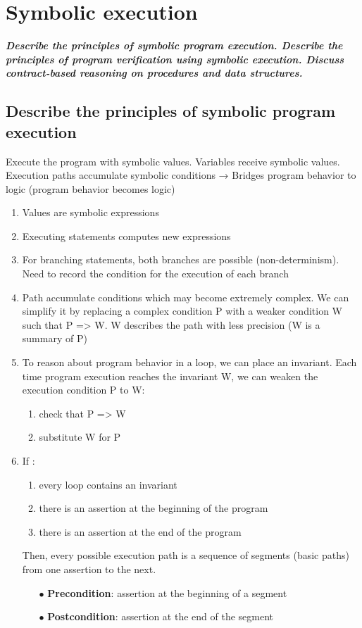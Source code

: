 \documentclass{article}
\begin{document}
\newpage
\section{Symbolic execution}
\textbf{\textit{Describe the principles of symbolic program execution. Describe the principles of program verification using symbolic execution. Discuss contract-based reasoning on procedures and data structures.}}

\subsection{Describe the principles of symbolic program execution}
Execute the program with symbolic values. Variables receive symbolic values. Execution paths
accumulate symbolic conditions → Bridges program behavior to logic (program behavior becomes logic)
\begin{enumerate}
    \item Values are symbolic expressions

    \item Executing statements computes new expressions
    \item For branching statements, both branches are possible (non-determinism). Need to record the
condition for the execution of each branch
    \item Path accumulate conditions which may become extremely complex. We can simplify it by
replacing a complex condition P with a weaker condition W such that P => W. W describes the
path with less precision (W is a summary of P)
    \item To reason about program behavior in a loop, we can place an invariant. Each time program
execution reaches the invariant W, we can weaken the execution condition P to W:
\begin{enumerate}
    \item check that P => W
    \item substitute W for P
\end{enumerate}
    \item If : 
    \begin{enumerate}
    \item every loop contains an invariant
    \item there is an assertion at the beginning of the program
    \item there is an assertion at the end of the program
\end{enumerate}
Then, every possible execution path is a sequence of segments (basic paths) from one assertion
to the next.
\begin{itemize}
    \item [$\bullet$]\textbf{Precondition}: assertion at the beginning of a segment
    \item [$\bullet$]\textbf{Postcondition}: assertion at the end of the segment
\end{itemize}
\end{enumerate}
\end{document}

